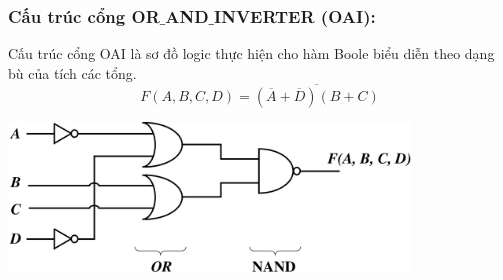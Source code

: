 \subsubsection{Cấu trúc cổng OR$\_$AND$\_$INVERTER (OAI):}
Cấu trúc cổng OAI là sơ đồ logic thực hiện cho hàm Boole biểu diễn theo dạng bù của tích các tổng.
\[
    F(A,B,C,D) = \overline{(\overline{A} + \overline{D})(B+C)}
\]
\begin{center}
    \includegraphics[width = 0.8\textwidth]{./local/image/42.png}
\end{center}
